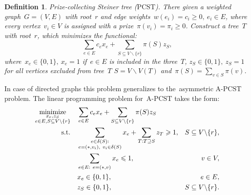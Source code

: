 \documentclass[12pt]{article}
\newtheorem{definition}{Definition}
\begin{document}
\begin{definition}{Prize-collecting Steiner tree ($\text{PCST}$).}
There given a weighted graph~$G=(V,E)$ with root~$r$ and edge weights~$w(e_i)=c_i\geqslant 0,~e_i\in E$, where every vertex~$v_i \in V$ is assigned with a \emph{prize}~$\pi(v_i)=\pi_i\geqslant 0$. Construct a tree~$T$ with root~$r$, which minimizes the  functional: \[\sum\limits_{e\in E}c_ex_e + \sum\limits_{S\subseteq V\backslash\{r\}}\pi(S)z_S,\]
where~$x_e\in\{0, 1\},~x_e=1$ if~$e\in E$ is included in the three~$T$, $z_S\in\{0, 1\},~z_S=1$ for all vertices excluded from tree~$T$ $S = V\backslash V(T)$ and~$\pi(S)= \sum_{v\in S}\pi(v)$.
\end{definition}
In case of directed graphs this problem generalizes to the~asymmetric $\text{A}$-$\text{PCST}$ problem. The linear programming problem for~$\text{A}$-$\text{PCST}$ takes the  form:
\begin{align}
\underset{\substack{x_e,z_S \\ e\in E, S\subseteq V\backslash \{r\}}}{\text{minimize}}\quad & \sum\limits_{e\in E}c_ex_e + \sum\limits_{S\subseteq V\backslash\{r\}}\pi(S)z_S \nonumber\\
\text{s.t.\quad} & \sum\limits_{\substack{e\in\delta(S):\\e=(\ast,v_i),~ v_i\in\delta(S)}}x_e + \sum\limits_{T:T\supseteq S}z_T\geqslant 1, & S\subseteq V\backslash \{r\},\nonumber\\
& \sum\limits_{e\in E:~e=(\ast,v)}x_e\leqslant 1, & v\in V,
\label{ilp_pcst_ord}\\
& x_e\in\{0,1\}, & e\in E,\nonumber\\
& z_S\in\{0,1\}, & S\subseteq V\backslash \{r\}.\nonumber
\end{align}
\end{document}
